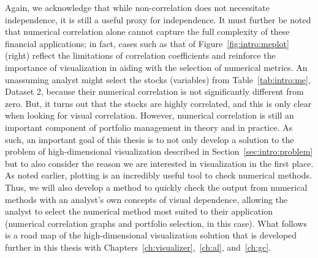 Again, we acknowledge that while non-correlation 
does not necessitate independence, it is still a useful proxy for independence.
It must further be noted that numerical correlation alone cannot capture the 
full complexity of these financial applications; in fact, cases such as that of 
Figure~\ref{fig:intro:meplot} (right) reflect the limitations of correlation 
coefficients and reinforce the importance of visualization in aiding with the 
selection of numerical metrics. An unassuming 
analyst might select the stocks (variables) from Table~\ref{tab:intro:me}, 
Dataset 2, because their numerical correlation is not significantly different 
from zero. But, it turns out that the stocks are highly correlated, and this is 
only clear when looking for visual correlation. However, numerical correlation 
is still an important component of portfolio management in theory and in 
practice. 
As such, an important goal of this thesis is to not only develop a 
solution to the problem of high-dimensional visualization described in 
Section~\ref{sec:intro:problem} but to also consider the reason we are 
interested in visualization in the first place. As noted earlier, plotting is 
an incredibly useful tool to check numerical methods. Thus, we will also 
develop a method to quickly check the output from numerical methods with an 
analyst's own concepts of visual dependence, allowing the analyst to select the 
numerical method most suited to their application (numerical correlation graphs 
and portfolio selection, in this case). 
What follows is a road map of the high-dimensional visualization solution that 
is developed further in this thesis with 
Chapters~\ref{ch:visualizer},~\ref{ch:al}, and~\ref{ch:gc}.